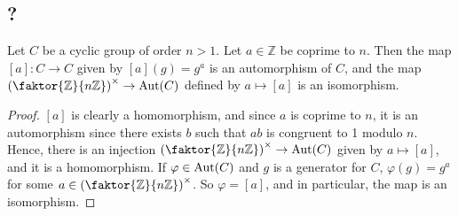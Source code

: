 \subsection{?}
\begin{lemma}
	Let \( C \) be a cyclic group of order \( n > 1 \).
	Let \( a \in \mathbb Z \) be coprime to \( n \).
	Then the map \( [a] \colon C \to C \) given by \( [a](g) = g^a \) is an automorphism of \( C \), and the map \( \qty(\faktor{\mathbb Z}{n\mathbb Z})^\times \to \Aut(C) \) defined by \( a \mapsto [a] \) is an isomorphism.
\end{lemma}
\begin{proof}
	\( [a] \) is clearly a homomorphism, and since \( a \) is coprime to \( n \), it is an automorphism since there exists \( b \) such that \( ab \) is congruent to 1 modulo \( n \).
	Hence, there is an injection \( \qty(\faktor{\mathbb Z}{n\mathbb Z})^\times \to \Aut(C) \) given by \( a \mapsto [a] \), and it is a homomorphism.
	If \( \varphi \in \operatorname{Aut}(C) \) and \( g \) is a generator for \( C \), \( \varphi(g) = g^a \) for some \( a \in \qty(\faktor{\mathbb Z}{n\mathbb Z})^\times \).
	So \( \varphi = [a] \), and in particular, the map is an isomorphism.
\end{proof}
